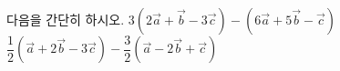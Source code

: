 다음을 간단히 하시오.
 $3(2\vec{a}+\vec{b}-3\vec{c})-(6\vec{a}+5\vec{b}-\vec{c})$
 $\dfrac{1}{2}(\vec{a}+2\vec{b}-3\vec{c})-\dfrac{3}{2}(\vec{a}-2\vec{b}+\vec{c})$
